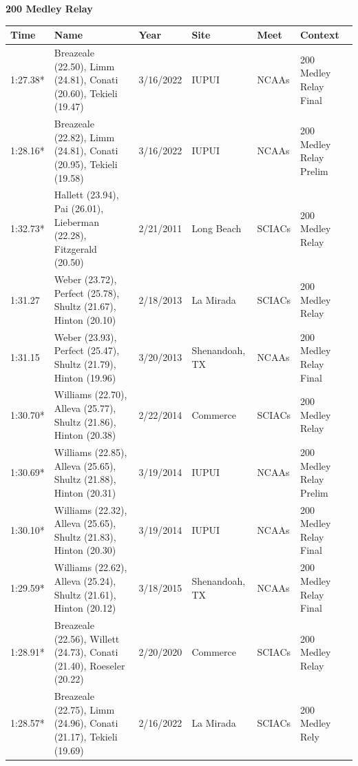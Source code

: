 \begin{table}[H]
\centering
\begin{minipage}[t]{0.6\textwidth}
\centering
\textbf{200 Medley Relay}\\[0.1cm]
\begin{tabular}{@{}p{1.8cm}p{2.8cm}p{1.2cm}p{1.4cm}p{1.4cm}p{2.0cm}@{}}
\hline
    \textbf{Time} & \textbf{Name} & \textbf{Year} & \textbf{Site} & \textbf{Meet} & \textbf{Context} \\
\hline
    1:27.38* & Breazeale (22.50), Limm (24.81), Conati (20.60), Tekieli (19.47) & 3/16/2022 & IUPUI & NCAAs & 200 Medley Relay Final \\
    1:28.16* & Breazeale (22.82), Limm (24.81), Conati (20.95), Tekieli (19.58) & 3/16/2022 & IUPUI & NCAAs & 200 Medley Relay Prelim \\
    1:32.73* & Hallett (23.94), Pai (26.01), Lieberman (22.28), Fitzgerald (20.50) & 2/21/2011 & Long Beach & SCIACs & 200 Medley Relay \\
    1:31.27 & Weber (23.72), Perfect (25.78), Shultz (21.67), Hinton (20.10) & 2/18/2013 & La Mirada & SCIACs & 200 Medley Relay \\
    1:31.15 & Weber (23.93), Perfect (25.47), Shultz (21.79), Hinton (19.96) & 3/20/2013 & Shenandoah, TX & NCAAs & 200 Medley Relay Final \\
    1:30.70* & Williams (22.70), Alleva (25.77), Shultz (21.86), Hinton (20.38) & 2/22/2014 & Commerce & SCIACs & 200 Medley Relay \\
    1:30.69* & Williams (22.85), Alleva (25.65), Shultz (21.88), Hinton (20.31) & 3/19/2014 & IUPUI & NCAAs & 200 Medley Relay Prelim \\
    1:30.10* & Williams (22.32), Alleva (25.65), Shultz (21.83), Hinton (20.30) & 3/19/2014 & IUPUI & NCAAs & 200 Medley Relay Final \\
    1:29.59* & Williams (22.62), Alleva (25.24), Shultz (21.61), Hinton (20.12) & 3/18/2015 & Shenandoah, TX & NCAAs & 200 Medley Relay Final \\
    1:28.91* & Breazeale (22.56), Willett (24.73), Conati (21.40), Roeseler (20.22) & 2/20/2020 & Commerce & SCIACs & 200 Medley Relay \\
    1:28.57* & Breazeale (22.75), Limm (24.96), Conati (21.17), Tekieli (19.69) & 2/16/2022 & La Mirada & SCIACs & 200 Medley Rely \\
\hline
\end{tabular}
\end{minipage}
\end{table}

